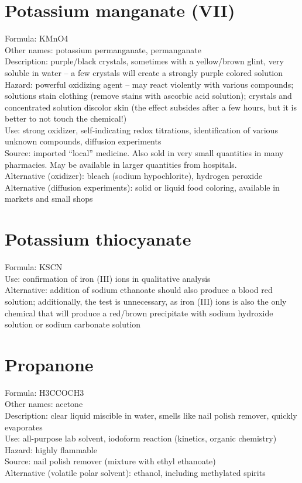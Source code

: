\section{Potassium manganate (VII)}
Formula: KMnO4\\
Other names: potassium permanganate, 
permanganate\\
Description: purple/black crystals, 
sometimes with a yellow/brown glint, 
very soluble in water – 
a few crystals will create a strongly purple colored solution\\
Hazard: powerful oxidizing agent – 
may react violently with various compounds; 
solutions stain clothing (remove stains with ascorbic acid solution); 
crystals and concentrated solution discolor skin 
(the effect subsides after a few hours, 
but it is better to not touch the chemical!)\\
Use: strong oxidizer, 
self-indicating redox titrations, 
identification of various unknown compounds, 
diffusion experiments\\
Source: imported “local” medicine. 
Also sold in very small quantities in many pharmacies. 
May be available in larger quantities from hospitals.\\
Alternative (oxidizer): bleach (sodium hypochlorite), 
hydrogen peroxide\\
Alternative (diffusion experiments): solid or liquid food coloring, 
available in markets and small shops

\section{Potassium thiocyanate}
Formula: KSCN\\
Use: confirmation of iron (III) ions in qualitative analysis\\
Alternative: addition of sodium ethanoate 
should also produce a blood red solution; 
additionally, 
the test is unnecessary, 
as iron (III) ions is also the only chemical 
that will produce a red/brown precipitate 
with sodium hydroxide solution or sodium carbonate solution

\section{Propanone}
Formula: H3CCOCH3\\
Other names: acetone\\
Description: clear liquid miscible in water, 
smells like nail polish remover, 
quickly evaporates\\
Use: all-purpose lab solvent, 
iodoform reaction (kinetics, organic chemistry)\\
Hazard: highly flammable\\
Source: nail polish remover (mixture with ethyl ethanoate)\\
Alternative (volatile polar solvent): ethanol, 
including methylated spirits

